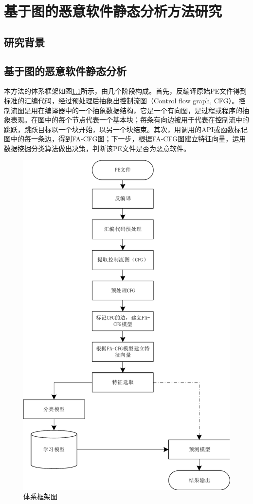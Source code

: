 \chapter{基于图的恶意软件静态分析方法研究}
\section{研究背景}

\section{基于图的恶意软件静态分析}
本方法的体系框架如图\ref{fig:chap1:Architecture}所示，由几个阶段构成。首先，反编译原始PE文件得到标准的汇编代码，经过预处理后抽象出控制流图（Control flow graph, CFG）。控制流图是用在编译器中的一个抽象数据结构，它是一个有向图，是过程或程序的抽象表现。在图中的每个节点代表一个基本块；每条有向边被用于代表在控制流中的跳跃，跳跃目标以一个块开始，以另一个块结束。其次，用调用的API或函数标记图中的每一条边，得到FA-CFG图；下一步，根据FA-CFG图建立特征向量，运用数据挖掘分类算法做出决策，判断该PE文件是否为恶意软件。

\begin{figure}[!ht]
\centering
\includegraphics[width=4.5in]{img/chap1/Architecture.pdf}
\caption{体系框架图}
\label{fig:chap1:Architecture}
\end{figure}

